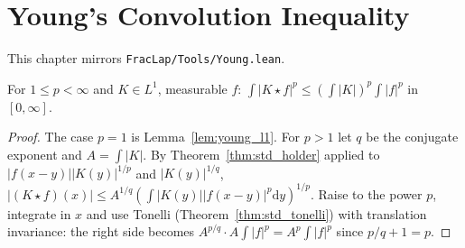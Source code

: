 \chapter{Young's Convolution Inequality}

This chapter mirrors \texttt{FracLap/Tools/Young.lean}.

\begin{theorem}\label{thm:young}
\leanok
For $1 \le p < \infty$ and $K \in L^1$, measurable $f$: $\int \lvert K \star f\rvert^p \le (\int \lvert K\rvert)^p \int \lvert f\rvert^p$ in $[0, \infty]$.
\end{theorem}

\begin{proof}
\leanok
The case $p = 1$ is Lemma~\ref{lem:young_l1}. For $p > 1$ let $q$ be the conjugate exponent and $A = \int\lvert K\rvert$. By Theorem~\ref{thm:std_holder} applied to $\lvert f(x - y)\rvert \lvert K(y)\rvert^{1/p}$ and $\lvert K(y)\rvert^{1/q}$, $\lvert (K \star f)(x)\rvert \le A^{1/q}(\int \lvert K(y)\rvert \lvert f(x-y)\rvert^p \mathrm{d}y)^{1/p}$. Raise to the power $p$, integrate in $x$ and use Tonelli (Theorem~\ref{thm:std_tonelli}) with translation invariance: the right side becomes $A^{p/q} \cdot A \int \lvert f\rvert^p = A^p \int \lvert f\rvert^p$ since $p/q + 1 = p$.
\end{proof}
